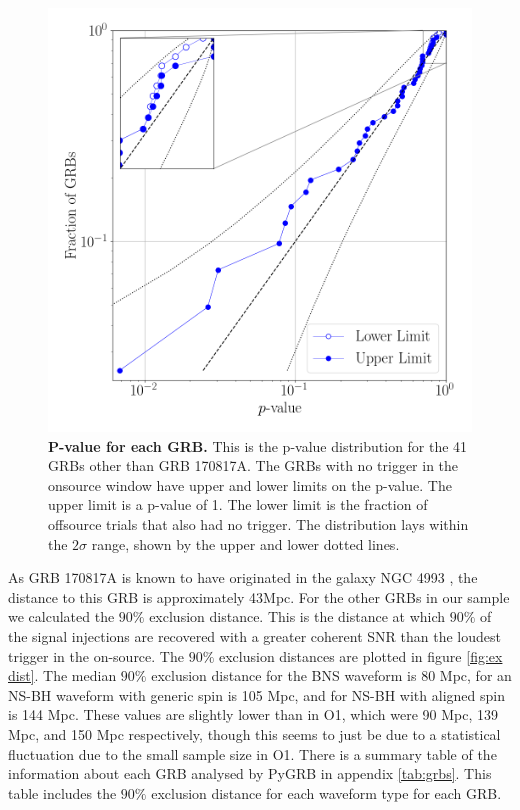 \documentclass[11pt]{cuthesis}
\begin{document}
\begin{figure}
\begin{center}
\includegraphics[width=0.8\linewidth]{pygrb_pvalue.png}
\end{center}
\caption{\textbf{P-value for each GRB.} This is the p-value distribution for the 41 GRBs other than GRB 170817A. The GRBs with no trigger in the onsource window have upper and lower limits on the p-value. The upper limit is a p-value of 1. The lower limit is the fraction of offsource trials that also had no trigger. The distribution lays within the $2\sigma$ range, shown by the upper and lower dotted lines.  }
\label{fig:pvalue}
\end{figure}

As GRB 170817A is known to have originated in the galaxy NGC 4993 \cite{GW170817_GRB}, the distance to this GRB is approximately 43Mpc. For the other GRBs in our sample we calculated the $90\%$ exclusion distance. This is the distance at which $90\%$ of the signal injections are recovered with a greater coherent SNR than the loudest trigger in the on-source. The $90\%$ exclusion distances are plotted in figure \ref{fig:ex dist}. The median $90\%$ exclusion distance for the BNS waveform is 80 Mpc, for an NS-BH waveform with generic spin is 105 Mpc, and for NS-BH with aligned spin is 144 Mpc. These values are slightly lower than in O1, which were 90 Mpc, 139 Mpc, and 150 Mpc respectively\cite{o1grb}, though this seems to just be due to a statistical fluctuation due to the small sample size in O1. There is a summary table of the information about each GRB analysed by PyGRB in appendix \ref{tab:grbs}. This table includes the $90\%$ exclusion distance for each waveform type for each GRB.
\end{document}
